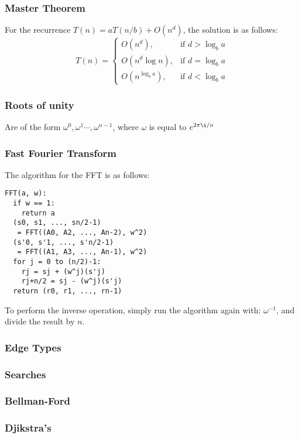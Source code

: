 \documentclass[letterpaper]{article}
\begin{document}
\begin{multicols}{3}
\subsubsection*{Master Theorem}
For the recurrence $T(n) = aT(n/b) + O(n^d)$, the solution is as follows:
\begin{equation*}
T(n) = 
\begin{cases}
O(n^d),&\text{if } d > \log_b a\\
O(n^d \log n),&\text{if } d = \log_b a\\
O(n^{\log_b a}),&\text{if } d < \log_b a
\end{cases}
\end{equation*}
\subsubsection*{Roots of unity}
Are of the form $\omega^{0}, \omega^{1} \cdots, \omega^{n-1}$, where $\omega$ is
equal to $e^{2 \pi \i / n}$

\subsubsection*{Fast Fourier Transform}
The algorithm for the FFT is as follows:
\begin{verbatim}
FFT(a, w):
  if w == 1:
    return a
  (s0, s1, ..., sn/2-1) 
   = FFT((A0, A2, ..., An-2), w^2)
  (s'0, s'1, ..., s'n/2-1) 
   = FFT((A1, A3, ..., An-1), w^2)
  for j = 0 to (n/2)-1:
    rj = sj + (w^j)(s'j)
    rj+n/2 = sj - (w^j)(s'j)
  return (r0, r1, ..., rn-1)
\end{verbatim}
To perform the inverse operation, simply run the algorithm again with:
$\omega^{-1}$, and divide the result by $n$.
\end{multicols}
\subsubsection*{Edge Types}
\subsubsection*{Searches}
\subsubsection*{Bellman-Ford}
\subsubsection*{Djikstra's}
\end{document}
